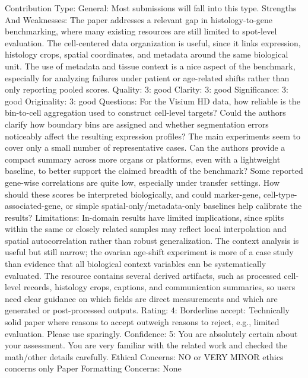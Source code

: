 Contribution Type: General: Most submissions will fall into this type.
Strengths And Weaknesses:
The paper addresses a relevant gap in histology-to-gene benchmarking, where many existing resources are still limited to spot-level evaluation.
The cell-centered data organization is useful, since it links expression, histology crops, spatial coordinates, and metadata around the same biological unit.
The use of metadata and tissue context is a nice aspect of the benchmark, especially for analyzing failures under patient or age-related shifts rather than only reporting pooled scores.
Quality: 3: good
Clarity: 3: good
Significance: 3: good
Originality: 3: good
Questions:
For the Visium HD data, how reliable is the bin-to-cell aggregation used to construct cell-level targets? Could the authors clarify how boundary bins are assigned and whether segmentation errors noticeably affect the resulting expression profiles?
The main experiments seem to cover only a small number of representative cases. Can the authors provide a compact summary across more organs or platforms, even with a lightweight baseline, to better support the claimed breadth of the benchmark?
Some reported gene-wise correlations are quite low, especially under transfer settings. How should these scores be interpreted biologically, and could marker-gene, cell-type-associated-gene, or simple spatial-only/metadata-only baselines help calibrate the results?
Limitations:
In-domain results have limited implications, since splits within the same or closely related samples may reflect local interpolation and spatial autocorrelation rather than robust generalization.
The context analysis is useful but still narrow; the ovarian age-shift experiment is more of a case study than evidence that all biological context variables can be systematically evaluated.
The resource contains several derived artifacts, such as processed cell-level records, histology crops, captions, and communication summaries, so users need clear guidance on which fields are direct measurements and which are generated or post-processed outputs.
Rating: 4: Borderline accept: Technically solid paper where reasons to accept outweigh reasons to reject, e.g., limited evaluation. Please use sparingly.
Confidence: 5: You are absolutely certain about your assessment. You are very familiar with the related work and checked the math/other details carefully.
Ethical Concerns: NO or VERY MINOR ethics concerns only
Paper Formatting Concerns:
None


